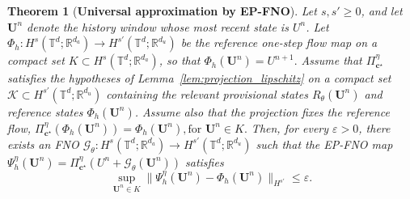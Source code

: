 \documentclass[11pt,a4paper]{article}
\newtheorem{theorem}{Theorem}[section]
\theoremstyle{definition}
\theoremstyle{remark}
\numberwithin{equation}{section}
\numberwithin{figure}{section}
\numberwithin{table}{section}
\begin{document}
\begin{theorem}[\textbf{Universal approximation by EP-FNO}]
\label{thm:epfno_universal_approximation}
Let \(s,s'\ge 0\), and let \(\mathbf U^n\) denote the history window whose
most recent state is \(U^n\). Let
$
\Phi_h:H^s(\mathbb T^d;\mathbb R^{d_a})
\to H^{s'}(\mathbb T^d;\mathbb R^{d_u})
$
be the reference one-step flow map on a compact set
\(K\subset H^s(\mathbb T^d;\mathbb R^{d_a})\), so that
$
    \Phi_h(\mathbf U^n)=U^{n+1}.
$
Assume that \(\Pi_{\mathbf c^\star}^{\eta}\) satisfies the hypotheses of
Lemma~\ref{lem:projection_lipschitz} on a compact set
\(\mathcal K\subset H^{s'}(\mathbb T^d;\mathbb R^{d_u})\) containing the
relevant provisional states \(R_\theta(\mathbf U^n)\) and reference states
\(\Phi_h(\mathbf U^n)\). Assume also that the projection fixes the reference flow,
$
    \Pi_{\mathbf c^\star}^{\eta}(\Phi_h(\mathbf U^n))
    =
    \Phi_h(\mathbf U^n), \text{for } \mathbf U^n\in K.
$
Then, for every \(\varepsilon>0\), there exists an FNO
$
\mathcal G_\theta:H^s(\mathbb T^d;\mathbb R^{d_a})
\to H^{s'}(\mathbb T^d;\mathbb R^{d_u})
$
such that the EP-FNO map $
    \Psi_h^\eta(\mathbf U^n)
    =
    \Pi_{\mathbf c^\star}^{\eta}
    \left(
    U^n+\mathcal G_\theta(\mathbf U^n)
    \right)
$
satisfies
\[
    \sup_{\mathbf U^n\in K}
    \|\Psi_h^\eta(\mathbf U^n)-\Phi_h(\mathbf U^n)\|_{H^{s'}}
    \le \varepsilon .
\]
\end{theorem}
\end{document}
